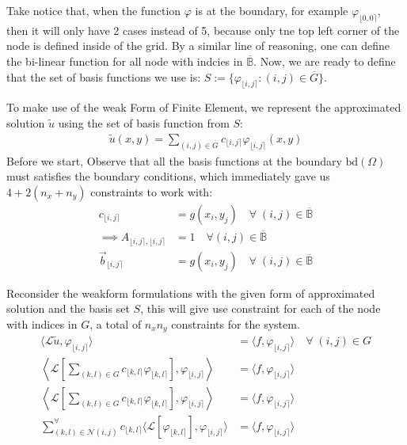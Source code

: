 \documentclass[]{article}
\begin{document}
    Take notice that, when the function $\varphi$ is at the boundary, for example $\varphi_{\lfloor 0, 0\rceil}$, then it will only have 2 cases instead of 5, because only tne top left corner of the node is defined inside of the grid. By a similar line of reasoning, one can define the bi-linear function for all node with indcies in $\overline{\mathbb{B}}$. Now, we are ready to define that the set of basis functions we use is: $S:= \{\varphi_{\lfloor i,j \rceil}: (i, j)\in \overline{G}\}$. 
    \par
    To make use of the weak Form of Finite Element, we represent the approximated solution $\tilde{u}$ using the set of basis function from $S$: 
    \begin{align*}\tag{3.5}\label{eqn:3.5}
        \tilde{u}(x,y) = 
        \sum_{(i, j)\in \overline{G}}^{}
        c_{\lfloor i,j \rceil}\varphi_{\lfloor i,j \rceil}(x, y)
    \end{align*}
    Before we start, Observe that all the basis functions at the boundary $\text{bd}(\Omega)$ must satisfies the boundary conditions, which immediately gave us $4 + 2(n_x + n_y)$ constraints to work with: 
    \begin{align*}\tag{3.6}\label{eqn:3.6}
        c_{\lfloor i, j\rceil} &= g(x_i, y_j) \quad \forall \; (i, j) \in \overline{\mathbb{B}}
        \\
        \implies
        A_{\lfloor i, j\rceil, \lfloor i, j\rceil} &= 
        1 \quad \forall (i, j) \in \overline{\mathbb{B}}
        \\
        \vec{b}_{\lfloor i,j \rceil} &= g(x_i, y_j)  
        \quad \forall \; (i, j) \in \overline{\mathbb{B}}
    \end{align*}
    \par
    Reconsider the weakform formulations with the given form of approximated solution and the basis set $S$, this will give use constraint for each of the node with indices in $G$, a total of $n_xn_y$ constraints for the system. 
    \begin{align*}\tag{3.7}\label{eqn:3.7}
        \langle \mathcal{L}\tilde{u}, \varphi_{\lfloor i,j \rceil}\rangle &= \langle f, \varphi_{\lfloor i,j \rceil}\rangle \quad \forall \; (i, j) \in G
        \\
        \left\langle 
        \mathcal{L}\left[
            \sum_{(k, l)\in G}^{}
            c_{\lfloor k, l\rceil}\varphi_{
                \lfloor k, l\rceil
            }
            \right], 
            \varphi_{\lfloor i,j \rceil}\right\rangle 
            &= \langle f, \varphi_{\lfloor i,j \rceil}
        \rangle
        \\
        \left\langle 
        \mathcal{L}\left[
            \sum_{(k, l)\in G}^{}
            c_{\lfloor k, l\rceil}\varphi_{
                \lfloor k, l\rceil
            }
            \right], 
            \varphi_{\lfloor i,j \rceil}\right\rangle 
            &= \langle f, \varphi_{\lfloor i,j \rceil}
        \rangle
        \\
        \sum_{(k, l)\in\mathcal{N}(i, j)}^{\forall}c_{\lfloor k, l\rceil}
        \langle \mathcal{L}[\varphi_{\lfloor k,l \rceil}], \varphi_{\lfloor i, j \rceil}\rangle
        &= \langle f, \varphi_{\lfloor i, j \rceil}\rangle
    \end{align*}
\end{document}
